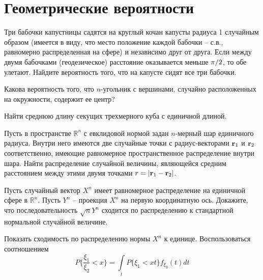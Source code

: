 \section{Геометрические вероятности}

\begin{problem}

Три бабочки капустницы садятся на круглый кочан капусты радиуса 1 случайным образом (имеется в виду, что место положение каждой бабочки -- с.в., равномерно распределенная на сфере) и независимо друг от друга. Если между двумя бабочками (геодезическое) расстояние оказывается меньше ${\pi \mathord{\left/ {\vphantom {\pi  2}} \right. \kern-\nulldelimiterspace} 2} $, то обе улетают. Найдите вероятность того, что на капусте сидят все три бабочки.

\end{problem}

\begin{problem}
Какова вероятность того, что $n$-угольник с вершинами, случайно расположенных на окружности, содержит ее центр?
\end{problem}

\begin{problem}
Найти среднюю длину секущих трехмерного куба с единичной длиной.
\end{problem}

\begin{problem}
Пусть в пространстве $\mathbb R^n$ с евклидовой нормой задан $n$-мерный шар единичного радиуса. Внутри него имеются две случайные точки с радиус-векторами ${\bf{r}}_1$ и ${\bf{r}}_2$ соответственно, имеющие равномерное пространственное распределение внутри шара. Найти распределение случайной величины, являющейся средним расстоянием между этими двумя точками $r = \left|{\bf r}_1 - {\bf r}_2\right|$.
\end{problem}

\begin{problem}
Пусть случайный вектор $X^{n} $ имеет равномерное распределение на единичной сфере в ${\mathbb R}^{n} $. Пусть $Y^{n} $ -- проекция $X^{n} $ на первую координатную ось. Докажите, что последовательность $\sqrt{n} Y^{n} $ сходится по распределению к стандартной нормальной случайной величине.

\begin{ordre} 
Показать сходимость по распределению нормы $X^{n} $ к единице. Воспользоваться соотношением
\[
P\{ \frac{\xi_1}{\xi_2} < x \} = \underset{t}{\int} P\{\xi_1 < xt \} f_{\xi_2}(t) dt
\] 
\end{ordre}
\end{problem}